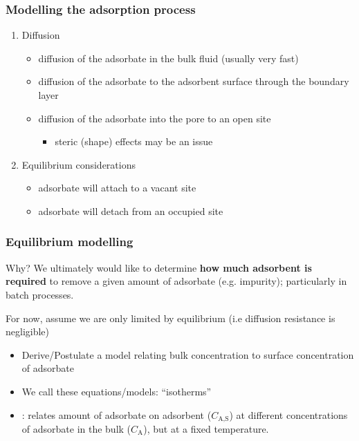 \begin{frame}\frametitle{Modelling the adsorption process}
	\begin{enumerate}
		\item	Diffusion
			\begin{itemize}
				\item	diffusion of the adsorbate in the bulk fluid (usually very fast)
				\item	diffusion of the adsorbate to the adsorbent surface through the boundary layer
				\item	diffusion of the adsorbate into the pore to an open site
				\begin{itemize}
					\item	steric (shape) effects may be an issue
				\end{itemize}
			\end{itemize}
		\item	Equilibrium considerations
			\begin{itemize}
				\item	adsorbate will attach to a vacant site
				\item	adsorbate will detach from an occupied site
			\end{itemize}
	\end{enumerate}
\end{frame}

\begin{frame}\frametitle{Equilibrium modelling}
	\begin{exampleblock}{Why?}
		We ultimately would like to determine \textbf{how much adsorbent is required} to remove a given amount of adsorbate (e.g. impurity); particularly in batch processes.
	\end{exampleblock}

	\vspace{12pt}
	For now, assume we are only limited by equilibrium (i.e diffusion resistance is negligible)
	\begin{itemize}
		\item	Derive/Postulate a model relating bulk concentration to surface concentration of adsorbate
		\item	We call these equations/models: ``isotherms''
		\item	{\color{purple}{Isotherm}}: relates amount of adsorbate on adsorbent ($C_\text{A,S}$) at different concentrations of adsorbate in the bulk ($C_\text{A}$), but at a fixed temperature.
	\end{itemize}
\end{frame}


